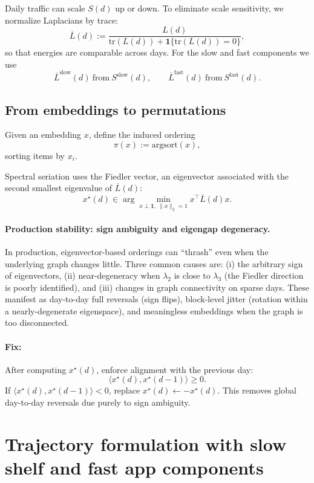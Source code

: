 \documentclass[11pt]{article}
\begin{document}
Daily traffic can scale $S(d)$ up or down.
To eliminate scale sensitivity, we normalize Laplacians by trace:
\[
\overline{L}(d) := \frac{L(d)}{\mathrm{tr}(L(d))+\mathbf{1}\{\mathrm{tr}(L(d))=0\}},
\]
so that energies are comparable across days.
For the slow and fast components we use
\[
\overline{L}^{\text{slow}}(d)\ \text{from}\ S^{\text{slow}}(d),
\qquad
\overline{L}^{\text{fast}}(d)\ \text{from}\ S^{\text{fast}}(d).
\]

\subsection{From embeddings to permutations}
Given an embedding $x$, define the induced ordering
\[
\pi(x) := \mathrm{argsort}(x),
\]
sorting items by $x_i$.

Spectral seriation uses the Fiedler vector, an eigenvector associated with the second smallest eigenvalue of $\overline{L}(d)$:
\[
x^{\star}(d)\in\arg\min_{x\perp\mathbf{1},\ \|x\|_2=1} x^\top \overline{L}(d) x.
\]

\paragraph{Production stability: sign ambiguity and eigengap degeneracy.}
In production, eigenvector-based orderings can ``thrash'' even when the underlying graph changes little.
Three common causes are: (i) the arbitrary sign of eigenvectors, (ii) near-degeneracy when $\lambda_2$ is close to $\lambda_3$ (the Fiedler direction is poorly identified), and (iii) changes in graph connectivity on sparse days.
These manifest as day-to-day full reversals (sign flips), block-level jitter (rotation within a nearly-degenerate eigenspace), and meaningless embeddings when the graph is too disconnected.

\paragraph{Fix:}
After computing $x^\star(d)$, enforce alignment with the previous day:
\[
\langle x^\star(d),x^\star(d-1)\rangle \ge 0.
\]
If $\langle x^\star(d),x^\star(d-1)\rangle < 0$, replace $x^\star(d)\leftarrow -x^\star(d)$.
This removes global day-to-day reversals due purely to sign ambiguity.

\section{Trajectory formulation with slow shelf and fast app components}
\end{document}
